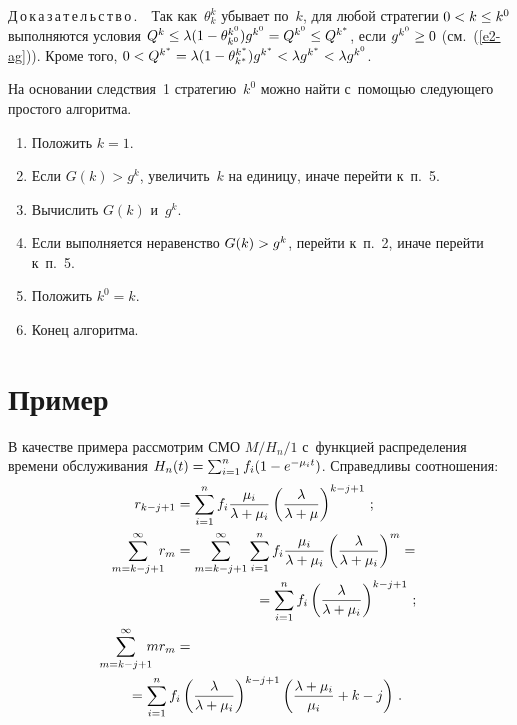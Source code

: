 \begin{multicols}{2}
  \smallskip
  
  \noindent
  Д\,о\,к\,а\,з\,а\,т\,е\,л\,ь\,с\,т\,в\,о\,.\ \  Так как~$\theta_k^k$ убывает 
по~$k$, для любой стратегии $0\hm< k\hm\leq k^0$ выполняются условия 
$Q^k\hm\leq \lambda (1\hm-\theta_{k^0}^{k^0}) g^{k^0} \hm= Q^{k^0} \hm\leq 
Q^{k^*}$, если $g^{k^0} \hm\geq 0$ (см.~(\ref{e2-ag})). Кроме того, $0\hm< 
Q^{k^*} \hm= \lambda (1\hm- \theta_{k^*}^{k^*})g^{k^*} \hm< \lambda g^{k^*} \hm 
< \lambda g^{k^0}$.
  
  На основании следствия~1 стратегию~$k^0$ можно найти с~помощью 
следующего простого алгоритма.
  \begin{enumerate}[1.]
\item Положить $k=1$.
\item Если $G(k)>g^k$, увеличить~$k$ на единицу, иначе перейти 
к~п.~5.
\item Вычислить $G(k)$ и~$g^k$.
\item Если выполняется неравенство $G(k)\hm> g^k$, перейти к~п.~2, 
иначе перейти к~п.~5.
\item Положить $k^0=k$.
\item Конец алгоритма.
  \end{enumerate}
  
\section{Пример}

  В качестве примера рассмотрим СМО $M/H_n/1$ с~функцией распределения 
времени обслуживания $H_n(t) \hm= \sum\nolimits_{i=1}^n f_i (1\hm- e^{-\mu_i 
t})$. Справедливы соотношения:
\begin{align*}
r_{k-j+1}&=\sum\limits_{i=1}^n f_i \fr{\mu_i}{\lambda +\mu_i}\left( 
\fr{\lambda}{\lambda+\mu}\right)^{k-j+1}\,;\\
\sum\limits^\infty_{m=k-j+1} \hspace*{-2mm} r_m&= \sum\limits^\infty_{m=k-j+1}
\sum\limits^n_{i=1} f_i \fr{\mu_i}{\lambda+\mu_i} \left(
\fr{\lambda}{\lambda+\mu_i}\right)^m={}\\
&\hspace*{20mm}{}=\sum\limits^n_{i=1} f_i
\left( \fr{\lambda}{\lambda+\mu_i}\right)^{k-j+1}\,;\\
\sum\limits^\infty_{m=k-j+1}\hspace*{-2mm} mr_m &={}\\
&\hspace*{-12mm}{}=
\sum\limits_{i=1}^n f_i \left( \fr{\lambda}{\lambda+\mu_i}\right)^{k-j+1}
\left( \fr{\lambda+\mu_i}{\mu_i}+k-j\right)\,.
\end{align*}
    

\end{multicols}
